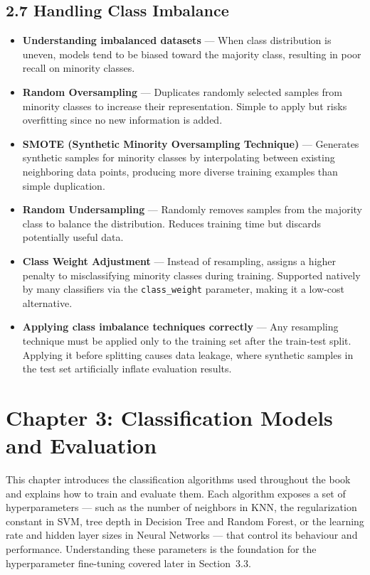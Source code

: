 \documentclass[12pt, a4paper]{article}
\begin{document}
\subsection*{2.7 Handling Class Imbalance}
\begin{itemize}
    \item \textbf{Understanding imbalanced datasets} --- When class distribution is uneven, models tend to be biased toward the majority class, resulting in poor recall on minority classes.
    \item \textbf{Random Oversampling} --- Duplicates randomly selected samples from minority classes to increase their representation. Simple to apply but risks overfitting since no new information is added.
    \item \textbf{SMOTE (Synthetic Minority Oversampling Technique)} --- Generates synthetic samples for minority classes by interpolating between existing neighboring data points, producing more diverse training examples than simple duplication.
    \item \textbf{Random Undersampling} --- Randomly removes samples from the majority class to balance the distribution. Reduces training time but discards potentially useful data.
    \item \textbf{Class Weight Adjustment} --- Instead of resampling, assigns a higher penalty to misclassifying minority classes during training. Supported natively by many classifiers via the \texttt{class\_weight} parameter, making it a low-cost alternative.
    \item \textbf{Applying class imbalance techniques correctly} --- Any resampling technique must be applied only to the training set after the train-test split. Applying it before splitting causes data leakage, where synthetic samples in the test set artificially inflate evaluation results.
\end{itemize}

\section*{Chapter 3: Classification Models and Evaluation}

This chapter introduces the classification algorithms used throughout the book and explains how to train and evaluate them. Each algorithm exposes a set of hyperparameters --- such as the number of neighbors in KNN, the regularization constant in SVM, tree depth in Decision Tree and Random Forest, or the learning rate and hidden layer sizes in Neural Networks --- that control its behaviour and performance. Understanding these parameters is the foundation for the hyperparameter fine-tuning covered later in Section~3.3.
\end{document}
